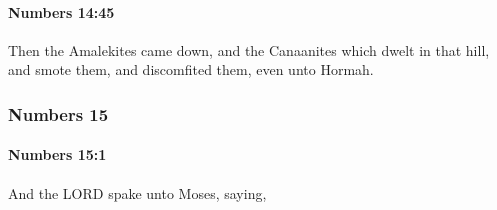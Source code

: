 		\paragraph{Numbers 14:45} %
			\label{NUMBERS-14-45}

			Then the Amalekites came down, and the Canaanites which dwelt in that hill, and smote them, and discomfited them, even unto Hormah.

	\subsubsection{Numbers 15} %
		\label{NUMBERS-15}

		\paragraph{Numbers 15:1} %
			\label{NUMBERS-15-1}

			And the LORD spake unto Moses, saying,

